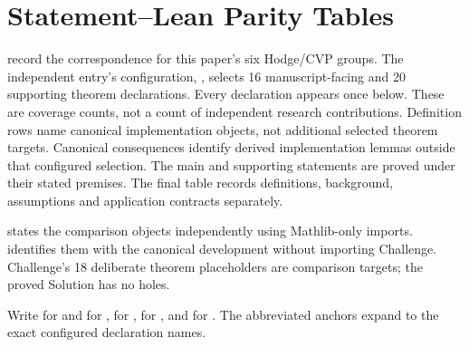 \appendix

\section{Statement--Lean Parity Tables}\label{app:selected-crosswalk}\label{app:formal-boundaries}

 record the correspondence for this paper's six
Hodge/CVP groups. The independent entry's
configuration, , selects 16
manuscript-facing and 20 supporting theorem declarations. Every declaration
appears once below. These are coverage counts, not a count of independent
research contributions. Definition rows name canonical implementation
objects, not additional selected theorem targets. Canonical consequences
identify derived implementation lemmas outside that configured selection.
The main and supporting statements are proved under their stated premises.
The final table records definitions, background, assumptions and application
contracts separately.

 states the comparison objects independently
using Mathlib-only imports.  identifies them
with the canonical development without importing Challenge. Challenge's 18
deliberate theorem placeholders are comparison targets; the proved Solution
has no holes.

Write  for  and
 for ,
 for ,
 for ,
and  for . The abbreviated anchors expand to the
exact configured declaration names.

